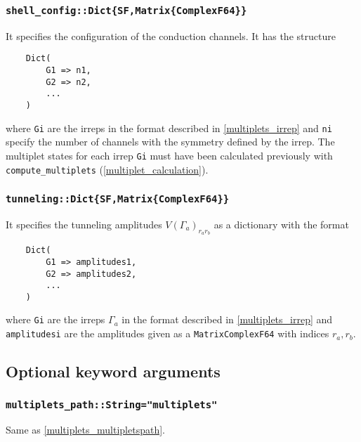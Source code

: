 \documentclass[notitlepage]{article}
\begin{document}
\subsubsection{\texttt{shell\_config::Dict\{SF,Matrix\{ComplexF64\}\}}}
\label{nrg_shellconfig}
It specifies the configuration of the conduction channels.
It has the structure
\begin{verbatim}
    Dict( 
        G1 => n1,
        G2 => n2,
        ...
    )
\end{verbatim}
where \texttt{Gi} are the irreps in the format described in
\ref{multiplets_irrep} and \texttt{ni} specify
the number of channels with the symmetry defined by the
irrep. The multiplet states for each irrep \texttt{Gi} must
have been calculated previously with
\texttt{compute\_multiplets} (\ref{multiplet_calculation}).

\subsubsection{\texttt{tunneling::Dict\{SF,Matrix\{ComplexF64\}\}}}
\label{nrg_tunnneling}
It specifies the tunneling amplitudes $V(\Gamma_a)_{r_a
r_b}$ as a dictionary with the format
\begin{verbatim}
    Dict(
        G1 => amplitudes1,
        G2 => amplitudes2,
        ...
    )
\end{verbatim}
where \texttt{Gi} are the irreps $\Gamma_a$ in the format 
described in \ref{multiplets_irrep} and \texttt{amplitudesi} are the
amplitudes given as a \texttt{Matrix{ComplexF64}} with indices $r_a,r_b$.

\subsection{Optional keyword arguments}

\subsubsection{\texttt{multiplets\_path::String="multiplets"}}
\label{nrg_multipletspath}
Same as \ref{multiplets_multipletspath}.
\end{document}
